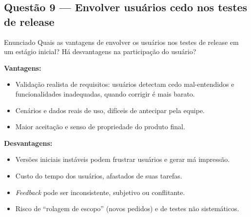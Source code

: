 \documentclass[11pt,a4paper]{article}
\begin{document}
\subsection*{Questão 9 — Envolver usuários cedo nos testes de release}
\begin{questao}{Enunciado}
Quais as vantagens de envolver os usuários nos testes de release em um estágio
inicial? Há desvantagens na participação do usuário?
\end{questao}
\begin{resposta}
\textbf{Vantagens:}
\begin{itemize}[nosep]
  \item Validação realista de requisitos: usuários detectam cedo mal-entendidos
        e funcionalidades inadequadas, quando corrigir é mais barato.
  \item Cenários e dados reais de uso, difíceis de antecipar pela equipe.
  \item Maior aceitação e senso de propriedade do produto final.
\end{itemize}
\textbf{Desvantagens:}
\begin{itemize}[nosep]
  \item Versões iniciais instáveis podem frustrar usuários e gerar má impressão.
  \item Custo do tempo dos usuários, afastados de suas tarefas.
  \item \emph{Feedback} pode ser inconsistente, subjetivo ou conflitante.
  \item Risco de “rolagem de escopo” (novos pedidos) e de testes não sistemáticos.
\end{itemize}
\end{resposta}

\end{document}
